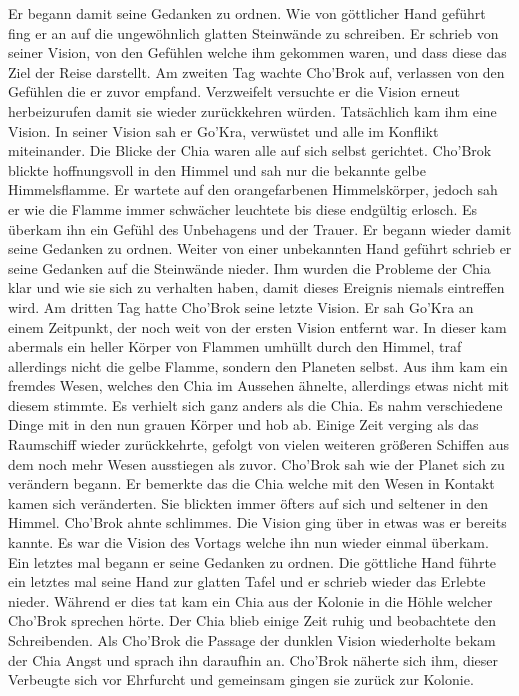 \documentclass[12pt]{article}
\begin{document}
Er begann damit seine Gedanken zu ordnen. Wie von göttlicher Hand geführt fing er an auf die ungewöhnlich glatten Steinwände zu schreiben. Er schrieb von seiner Vision, von den Gefühlen welche ihm gekommen waren, und dass diese das Ziel der Reise darstellt.\newline
Am zweiten Tag wachte Cho'Brok auf, verlassen von den Gefühlen die er zuvor empfand. Verzweifelt versuchte er die Vision erneut herbeizurufen damit sie wieder zurückkehren würden. Tatsächlich kam ihm eine Vision. In seiner Vision sah er Go'Kra, verwüstet und alle im Konflikt miteinander. Die Blicke der Chia waren alle auf sich selbst gerichtet. Cho'Brok blickte hoffnungsvoll in den Himmel und sah nur die bekannte gelbe Himmelsflamme. Er wartete auf den orangefarbenen Himmelskörper, jedoch sah er wie die Flamme immer schwächer leuchtete bis diese endgültig erlosch. Es überkam ihn ein Gefühl des Unbehagens und der Trauer.\newline
Er begann wieder damit seine Gedanken zu ordnen. Weiter von einer unbekannten Hand geführt schrieb er seine Gedanken auf die Steinwände nieder. Ihm wurden die Probleme der Chia klar und wie sie sich zu verhalten haben, damit dieses Ereignis niemals eintreffen wird.\newline
Am dritten Tag hatte Cho'Brok seine letzte Vision. Er sah Go'Kra an einem Zeitpunkt, der noch weit von der ersten Vision entfernt war. In dieser kam abermals ein heller Körper von Flammen umhüllt durch den Himmel, traf allerdings nicht die gelbe Flamme, sondern den Planeten selbst. Aus ihm kam ein fremdes Wesen, welches den Chia im Aussehen ähnelte, allerdings etwas nicht mit diesem stimmte. Es verhielt sich ganz anders als die Chia. Es nahm verschiedene Dinge mit in den nun grauen Körper und hob ab. Einige Zeit verging als das Raumschiff wieder zurückkehrte, gefolgt von vielen weiteren größeren Schiffen aus dem noch mehr Wesen ausstiegen als zuvor. Cho'Brok sah wie der Planet sich zu verändern begann. Er bemerkte das die Chia welche mit den Wesen in Kontakt kamen sich veränderten. Sie blickten immer öfters auf sich und seltener in den Himmel. Cho'Brok ahnte schlimmes. Die Vision ging über in etwas was er bereits kannte. Es war die Vision des Vortags welche ihn nun wieder einmal überkam.\newline
Ein letztes mal begann er seine Gedanken zu ordnen. Die göttliche Hand führte ein letztes mal seine Hand zur glatten Tafel und er schrieb wieder das Erlebte nieder. Während er dies tat kam ein Chia aus der Kolonie in die Höhle welcher Cho'Brok sprechen hörte. Der Chia blieb einige Zeit ruhig und beobachtete den Schreibenden. Als Cho'Brok die Passage der dunklen Vision wiederholte bekam der Chia Angst und sprach ihn daraufhin an. Cho'Brok näherte sich ihm, dieser Verbeugte sich vor Ehrfurcht und gemeinsam gingen sie zurück zur Kolonie.\newline
\end{document}
